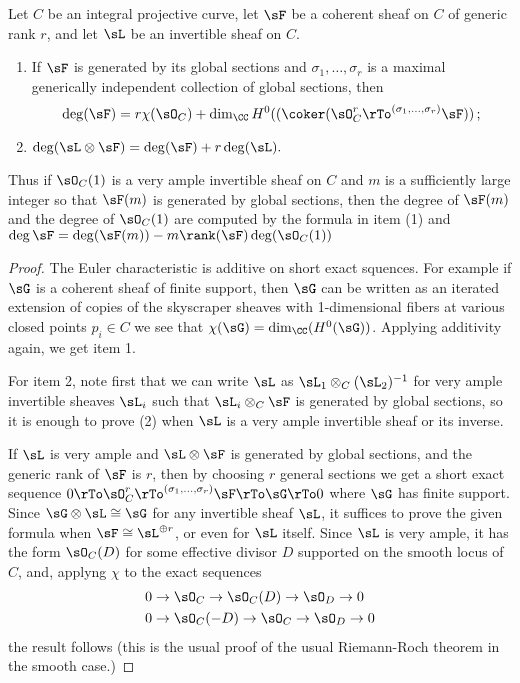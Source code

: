 \begin{lemma} Let $C$ be an integral projective curve, let $\sF$ be a coherent sheaf on $C$ of generic rank $r$, and let $\sL$ be an invertible sheaf on $C$.
\begin{enumerate}
\item If $\sF$ is generated by its global sections and $\sigma_1,\dots, \sigma_r$ is a maximal generically independent
collection of global sections,  then 
$$
\deg (\sF) = r \chi(\sO_C)+
\dim_\CC H^0((\coker(\sO_C^r \rTo^{(\sigma_1,\dots, \sigma_r)}\sF))\,;
$$

\item $\deg (\sL \otimes \sF) = \deg (\sF) +r\deg (\sL).$

\end{enumerate}
Thus if $\sO_C(1)$ is a very ample invertible sheaf on $C$ and $m$ is a sufficiently large integer so that
$\sF(m)$ is generated by global sections, then the degree of $\sF(m)$ and the degree of $\sO_C(1)$ are computed by the formula in item (1)
and $\deg \sF = \deg(\sF(m)) - m \rank(\sF) \deg (\sO_C(1))$
\end{lemma}

\begin{proof}
The Euler characteristic is additive on short exact squences. For example if $\sG$ is a coherent sheaf of finite support, then $\sG$ can be written as an iterated extension of
copies of the skyscraper sheaves with 1-dimensional fibers at various closed points $p_i\in C$ we see that $\chi(\sG) = \dim_\CC(H^0(\sG))$. Applying additivity again, we get item 1.

For item 2, note first that we can write $\sL$ as $\sL_1\otimes_C(\sL_2)^{-1}$ for very ample invertible sheaves
$\sL_i$ such that $\sL_i\otimes_C\sF$ is generated by global sections, so it is enough to prove (2) when $\sL$ is
a very ample invertible sheaf or its inverse. 

If $\sL$ is very ample and $\sL\otimes \sF$ is generated by global sections,
and the generic rank of $\sF$ is $r$, then by choosing $r$ general sections we get a short exact sequence
$0\rTo \sO_C^r \rTo^{(\sigma_1,\dots, \sigma_r)}\sF \rTo \sG\rTo 0$
where $\sG$ has finite support. Since $\sG \otimes \sL \cong \sG$ for any invertible sheaf $\sL$, it suffices to 
prove the given formula when $\sF \cong \sL^{\oplus r}$, or even for $\sL$ itself. Since $\sL$ is very ample,
it has the form $\sO_C(D)$ for some effective divisor $D$ supported on the smooth locus of $C$, 
and, applyng $\chi$ to the exact sequences 
$$ 
\begin{aligned}
&0\to \sO_C \to \sO_C(D)  \to \sO_D \to 0\\
&0\to \sO_C(-D) \to \sO_C  \to \sO_D \to 0\\
\end{aligned}
$$
the result follows (this is the usual proof of the usual Riemann-Roch theorem in the smooth case.)
\end{proof}

